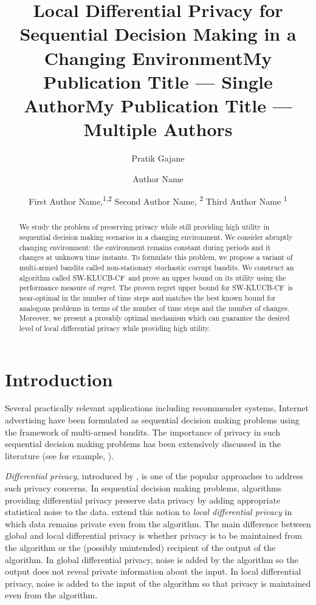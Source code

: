 \documentclass[letterpaper]{article} %
\title{Local Differential Privacy for Sequential Decision Making in a Changing Environment}
\author{
  Pratik Gajane
}
\title{My Publication Title --- Single Author}
\author {
    Author Name
}
\title{My Publication Title --- Multiple Authors}
\author {
    First Author Name,\textsuperscript{\rm 1,\rm 2}
    Second Author Name, \textsuperscript{\rm 2}
    Third Author Name \textsuperscript{\rm 1}
}
\newcommand{\SWKLUCBCF}{\textsc{SW-KLUCB-CF}}
\begin{document}
\maketitle

\begin{abstract}
We study the problem of preserving privacy while still providing high utility in sequential decision making scenarios in a changing environment.  We consider abruptly changing environment: the environment remains constant during periods and it changes at unknown time instants. %
To formulate this problem, we propose a variant of multi-armed bandits called non-stationary stochastic corrupt bandits.
We construct an algorithm called \SWKLUCBCF \ and prove an upper bound on its utility using the performance measure of \textit{regret}. The proven regret upper bound for \SWKLUCBCF \ is near-optimal in the number of time steps and matches the best known bound for analogous problems in terms of the number of time steps and the number of changes. Moreover, we present a provably optimal mechanism which can guarantee the desired level of local differential privacy while providing high utility.
\end{abstract}

\section{Introduction}
Several practically relevant applications including recommender systems, Internet advertising have been formulated as sequential decision making problems using the framework of multi-armed bandits. The importance of privacy in such sequential decision making problems has been extensively discussed in the literature (see for example, %
\citet{DBLP:conf/nips/ThakurtaS13,DBLP:conf/uai/MishraT15,tossou:aaai2016}).

\textit{Differential privacy}, introduced by \citet{Dwork06calibratingnoise}, is one of the popular approaches to address such privacy concerns.  
In sequential decision making problems, algorithms providing differential privacy preserve data privacy by adding appropriate statistical noise to the data. 
%
\citet{Duchi:2014:PAL:2700084.2666468} extend this notion to \textit{local differential privacy} in which data remains private even from the algorithm. 
The main difference between global and local differential privacy is whether privacy is to be maintained from the algorithm or the (possibly unintended) recipient of the output of the algorithm. In global differential privacy, noise is added by the algorithm so the output does not reveal private information about the input. In local differential privacy, noise is added to the input of the algorithm so that privacy is maintained even from the algorithm. 
\end{document}
